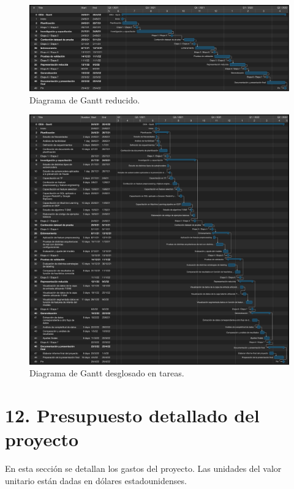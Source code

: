\documentclass[
11pt, %
]{charter}
\begin{document}
\begin{figure}[htpb]
\centering 
\includegraphics[width=\textwidth]{./Figuras/ganttReducido.pdf}
\caption{Diagrama de Gantt reducido.}
\label{fig:ganttReducido}
\end{figure}

\begin{figure}[htpb]
\centering 
\includegraphics[width=\textwidth,  height=0.9\textheight]{./Figuras/ganttCompleto.pdf}
\caption{Diagrama de Gantt desglosado en tareas.}
\label{fig:ganttCompleto}
\end{figure}

\section{12. Presupuesto detallado del proyecto}
\label{sec:presupuesto}

En esta sección se detallan los gastos del proyecto. Las unidades del valor unitario están dadas en dólares estadounidenses.
\end{document}
